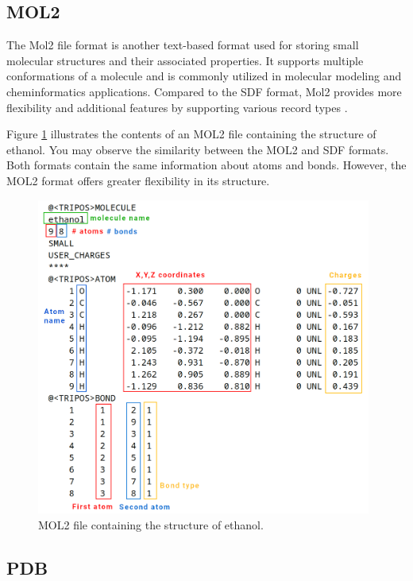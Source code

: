 \documentclass[
  digital,     %
  oneside,     %
  nosansbold,  %
  nocolorbold, %
  lof,         %
  lot,         %
]{fithesis4}
\begin{document}
\subsection{MOL2}
\label{subsection:mol2}

The Mol2 file format is another text-based format used for storing small molecular structures and their associated properties. It supports multiple conformations of a molecule and is commonly utilized in molecular modeling and cheminformatics applications. Compared to the SDF format, Mol2 provides more flexibility and additional features by supporting various record types \cite{manish}.

Figure \ref{fig:mol2} illustrates the contents of an MOL2 file containing the structure of ethanol. You may observe the similarity between the MOL2 and SDF formats. Both formats contain the same information about atoms and bonds. However, the MOL2 format offers greater flexibility in its structure.

\begin{figure}[htbp]
  \begin{center}
    \includegraphics[width=11cm]{figures/mol2_file_format.png}
  \end{center}
  \caption{MOL2 file containing the structure of ethanol.}
  \label{fig:mol2}
\end{figure}

\subsection{PDB}
\label{subsection:pdb}
\end{document}
